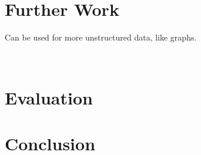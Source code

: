 \documentclass[a4paper,12pt,twoside,openright]{report}
\begin{document}
\chapter{Further Work}

Can be used for more unstructured data, like graphs.

\
\chapter{Evaluation}

\chapter{Conclusion}

\appendix
\singlespacing

 
% 
\end{document}
